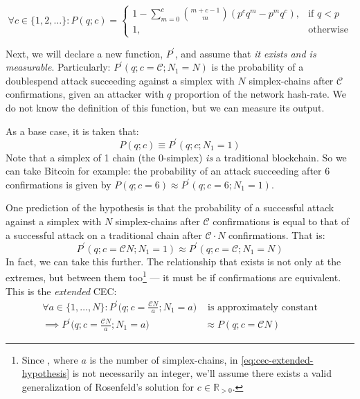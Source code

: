 \begin{equation}
  \forall c \in \{1, 2, \dots\}: P(q; c) = \begin{cases}
        1 - \sum_{m=0}^c \binom{m+c-1}{m}(p^c q^m - p^m q^c), & \text{if } q < p \\
        1, & \text{otherwise}
    \end{cases}
    \label{eq:rosenfeld-analytical-p}
\end{equation}

Next, we will declare a new function, $P^\prime$, and assume that \emph{it exists and is measurable}.
Particularly: $P^\prime(q; c = \mathcal{C}; N_1 = N)$ is the probability of a doublespend attack succeeding against a simplex with $N$ simplex-chains after $\mathcal{C}$ confirmations, given an attacker with $q$ proportion of the network hash-rate.
We do not know the definition of this function, but we can measure its output.

As a base case, it is taken that:
\begin{equation}
    P(q; c) \equiv P^\prime(q; c; N_1 = 1)
    \label{eq:cec-base-case}
\end{equation}
Note that a simplex of 1 chain (the 0-simplex) \emph{is} a traditional blockchain.
So we can take Bitcoin for example: the probability of an attack succeeding after 6 confirmations is given by $P(q; c = 6) \approx P^\prime(q; c = 6; N_1 = 1)$.

One prediction of the hypothesis is that the probability of a successful attack against a simplex with $N$ simplex-chains after $\mathcal{C}$ confirmations is equal to that of a successful attack on a traditional chain after $\mathcal{C}\cdot N$ confirmations.
That is:
\begin{equation}
  P^\prime(q; c = \mathcal{C}N; N_1 = 1) \approx P^\prime(q; c = \mathcal{C}; N_1 = N)
    \label{eq:por-sim-hypothesis}
\end{equation}
In fact, we can take this further.
The relationship that exists is not only at the extremes, but between them too\footnote{
  Since , where $a$ is the number of simplex-chains, in \autoref{eq:cec-extended-hypothesis} is not necessarily an integer, we'll assume there exists a valid generalization of Rosenfeld's solution for $c \in \mathbb{R}_{>0}$.
} --- it must be if confirmations are equivalent.
This is the \emph{extended} CEC:
\begin{equation}
    \begin{split}
      \forall a \in \{1,\dots,N\}: P^\prime\biggl(q; c = \frac{\mathcal{C}N}{a}; N_1 = a\biggr) &\text{ is approximately constant}
        \label{eq:cec-extended-hypothesis} \\
        \implies P^\prime\biggl(q; c = \frac{\mathcal{C}N}{a}; N_1 = a\biggr) &\approx P(q; c = \mathcal{C}N)
    \end{split}
\end{equation}

